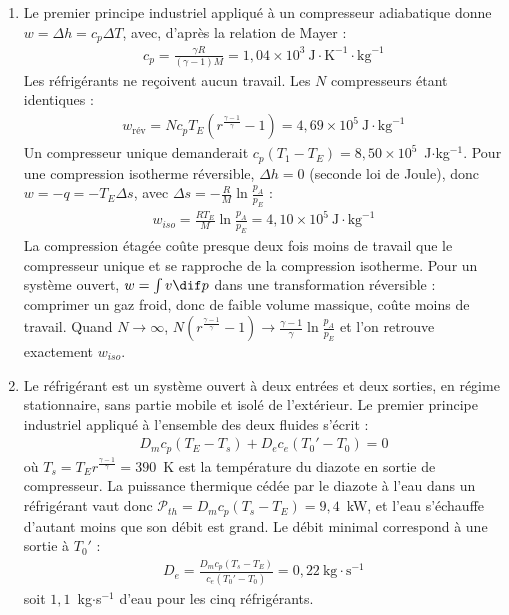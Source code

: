 \begin{correction}
\begin{enumerate}
	\item Le premier principe industriel appliqué à un compresseur adiabatique donne $w=\Delta h=c_p\Delta T$, avec, d'après la relation de Mayer :
	\begin{align*}
		c_p=\frac{\gamma R}{(\gamma-1)M}=1{,}04\times10^{3}~\text{J}\cdot\text{K}^{-1}\cdot\text{kg}^{-1}
	\end{align*}
	Les réfrigérants ne reçoivent aucun travail. Les $N$ compresseurs étant identiques :
	\begin{align*}
		\boxed{w_{\text{rév}}=Nc_pT_E\left(r^{\frac{\gamma-1}{\gamma}}-1\right)}=4{,}69\times10^{5}~\text{J}\cdot\text{kg}^{-1}
	\end{align*}
	Un compresseur unique demanderait $c_p(T_1-T_E)=8{,}50\times10^{5}$~J$\cdot$kg$^{-1}$. Pour une compression isotherme réversible, $\Delta h=0$ (seconde loi de Joule), donc $w=-q=-T_E\Delta s$, avec $\Delta s=-\frac{R}{M}\ln\frac{p_A}{p_E}$ :
	\begin{align*}
		w_{iso}=\frac{RT_E}{M}\ln\frac{p_A}{p_E}=4{,}10\times10^{5}~\text{J}\cdot\text{kg}^{-1}
	\end{align*}
	La compression étagée coûte presque deux fois moins de travail que le compresseur unique et se rapproche de la compression isotherme. Pour un système ouvert, $w=\int v\dif p$ dans une transformation réversible : comprimer un gaz froid, donc de faible volume massique, coûte moins de travail. Quand $N\to\infty$, $N\left(r^{\frac{\gamma-1}{\gamma}}-1\right)\to\frac{\gamma-1}{\gamma}\ln\frac{p_A}{p_E}$ et l'on retrouve exactement $w_{iso}$.

	\item Le réfrigérant est un système ouvert à deux entrées et deux sorties, en régime stationnaire, sans partie mobile et isolé de l'extérieur. Le premier principe industriel appliqué à l'ensemble des deux fluides s'écrit :
	\begin{align*}
		D_mc_p\left(T_E-T_s\right)+D_ec_e\left(T_0'-T_0\right)=0
	\end{align*}
	où $T_s=T_Er^{\frac{\gamma-1}{\gamma}}=390$~K est la température du diazote en sortie de compresseur. La puissance thermique cédée par le diazote à l'eau dans un réfrigérant vaut donc $\mathcal{P}_{th}=D_mc_p(T_s-T_E)=9{,}4$~kW, et l'eau s'échauffe d'autant moins que son débit est grand. Le débit minimal correspond à une sortie à $T_0'$ :
	\begin{align*}
		\boxed{D_e=\frac{D_mc_p\left(T_s-T_E\right)}{c_e\left(T_0'-T_0\right)}}=0{,}22~\text{kg}\cdot\text{s}^{-1}
	\end{align*}
	soit $1{,}1$~kg$\cdot$s$^{-1}$ d'eau pour les cinq réfrigérants.


\end{enumerate}
\end{correction}
